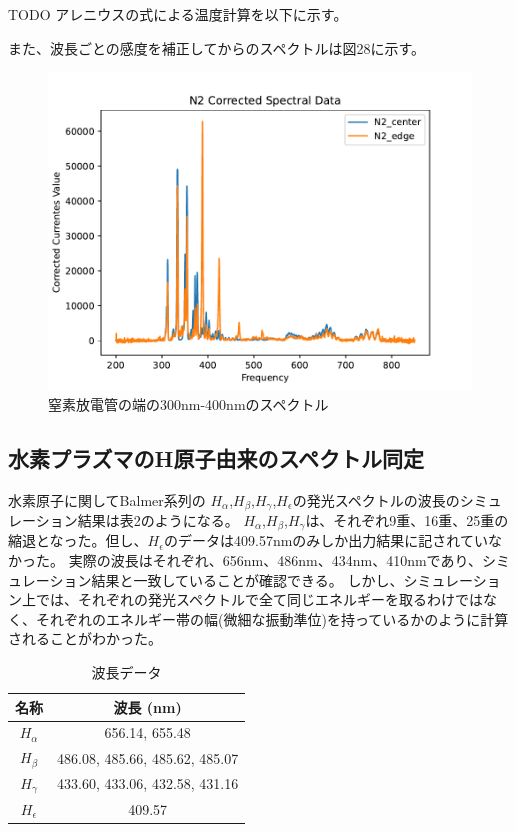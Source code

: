 \documentclass[a4j,twocolumn]{jsarticle}
\begin{document}
TODO
アレニウスの式による温度計算を以下に示す。

また、波長ごとの感度を補正してからのスペクトルは図28に示す。

\begin{figure}[htb]
    \centering
    \includegraphics[keepaspectratio,width=0.6\columnwidth]{fig/hahaha.pdf}
    \caption{窒素放電管の端の300nm-400nmのスペクトル}
\end{figure}





\subsection*{水素プラズマのH原子由来のスペクトル同定}

水素原子に関してBalmer系列の $H_\alpha$,$H_\beta$,$H_\gamma$,$H_\epsilon$の発光スペクトルの波長のシミュレーション結果は表2のようになる。
$H_\alpha$,$H_\beta$,$H_\gamma$は、それぞれ9重、16重、25重の縮退となった。但し、$H_\epsilon$のデータは409.57nmのみしか出力結果に記されていなかった。
実際の波長はそれぞれ、656nm、486nm、434nm、410nmであり、シミュレーション結果と一致していることが確認できる。
しかし、シミュレーション上では、それぞれの発光スペクトルで全て同じエネルギーを取るわけではなく、それぞれのエネルギー帯の幅(微細な振動準位)を持っているかのように計算されることがわかった。


\begin{table}[h]
    \centering
    \begin{tabular}{|c|c|}
        \hline
        \textbf{名称} & \textbf{波長 (nm)} \\
        \hline
        $H_\alpha$ & 656.14, 655.48 \\
        \hline
        $H_\beta$ & 486.08, 485.66, 485.62, 485.07 \\
        \hline
        $H_\gamma$ & 433.60, 433.06, 432.58, 431.16 \\
        \hline
        $H_\epsilon$ & 409.57 \\
        \hline
    \end{tabular}
    \caption{波長データ}
\end{table}
\end{document}
